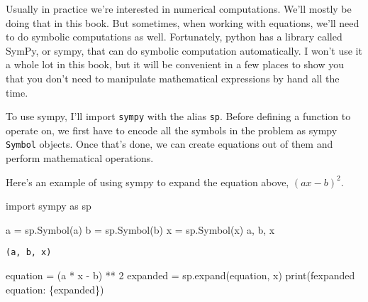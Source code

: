 \documentclass[
  letterpaper,
  DIV=11,
  numbers=noendperiod]{scrreprt}
\newenvironment{Shaded}{\begin{snugshade}}{\end{snugshade}}
\newcommand{\BuiltInTok}[1]{\textcolor[rgb]{0.00,0.23,0.31}{#1}}
\newcommand{\DecValTok}[1]{\textcolor[rgb]{0.68,0.00,0.00}{#1}}
\newcommand{\ImportTok}[1]{\textcolor[rgb]{0.00,0.46,0.62}{#1}}
\newcommand{\NormalTok}[1]{\textcolor[rgb]{0.00,0.23,0.31}{#1}}
\newcommand{\OperatorTok}[1]{\textcolor[rgb]{0.37,0.37,0.37}{#1}}
\newcommand{\SpecialCharTok}[1]{\textcolor[rgb]{0.37,0.37,0.37}{#1}}
\newcommand{\SpecialStringTok}[1]{\textcolor[rgb]{0.13,0.47,0.30}{#1}}
\newcommand{\StringTok}[1]{\textcolor[rgb]{0.13,0.47,0.30}{#1}}
\begin{document}
Usually in practice we're interested in numerical computations. We'll
mostly be doing that in this book. But sometimes, when working with
equations, we'll need to do symbolic computations as well. Fortunately,
python has a library called SymPy, or sympy, that can do symbolic
computation automatically. I won't use it a whole lot in this book, but
it will be convenient in a few places to show you that you don't need to
manipulate mathematical expressions by hand all the time.

To use sympy, I'll import \texttt{sympy} with the alias \texttt{sp}.
Before defining a function to operate on, we first have to encode all
the symbols in the problem as sympy \texttt{Symbol} objects. Once that's
done, we can create equations out of them and perform mathematical
operations.

Here's an example of using sympy to expand the equation above,
\((ax-b)^2\).

\begin{Shaded}
\begin{Highlighting}[]
\ImportTok{import}\NormalTok{ sympy }\ImportTok{as}\NormalTok{ sp}
\end{Highlighting}
\end{Shaded}

\begin{Shaded}
\begin{Highlighting}[]
\NormalTok{a }\OperatorTok{=}\NormalTok{ sp.Symbol(}\StringTok{\textquotesingle{}a\textquotesingle{}}\NormalTok{)}
\NormalTok{b }\OperatorTok{=}\NormalTok{ sp.Symbol(}\StringTok{\textquotesingle{}b\textquotesingle{}}\NormalTok{)}
\NormalTok{x }\OperatorTok{=}\NormalTok{ sp.Symbol(}\StringTok{\textquotesingle{}x\textquotesingle{}}\NormalTok{)}
\NormalTok{a, b, x}
\end{Highlighting}
\end{Shaded}

\begin{verbatim}
(a, b, x)
\end{verbatim}

\begin{Shaded}
\begin{Highlighting}[]
\NormalTok{equation }\OperatorTok{=}\NormalTok{ (a }\OperatorTok{*}\NormalTok{ x }\OperatorTok{{-}}\NormalTok{ b) }\OperatorTok{**} \DecValTok{2}
\NormalTok{expanded }\OperatorTok{=}\NormalTok{ sp.expand(equation, x)}
\BuiltInTok{print}\NormalTok{(}\SpecialStringTok{f\textquotesingle{}expanded equation: }\SpecialCharTok{\{}\NormalTok{expanded}\SpecialCharTok{\}}\SpecialStringTok{\textquotesingle{}}\NormalTok{)}
\end{Highlighting}
\end{Shaded}
\end{document}
